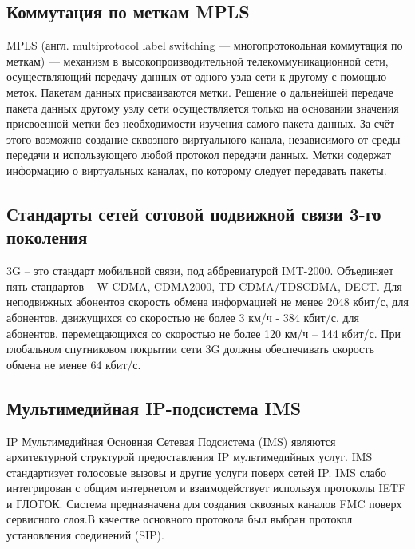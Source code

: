 \documentclass[unicode, 12pt, a4paper,oneside]{article}
\begin{document}
\begin{multicols}{2}
\subsection{Коммутация по меткам MPLS}
MPLS (англ. multiprotocol label switching — многопротокольная коммутация по меткам) — механизм в высокопроизводительной телекоммуникационной сети, осуществляющий передачу данных от одного узла сети к другому с помощью меток. Пакетам данных присваиваются метки. Решение о дальнейшей передаче пакета данных другому узлу сети осуществляется только на основании значения присвоенной метки без необходимости изучения самого пакета данных. За счёт этого возможно создание сквозного виртуального канала, независимого от среды передачи и использующего любой протокол передачи данных. Метки содержат информацию о виртуальных каналах, по которому следует передавать пакеты.

\subsection{Стандарты сетей сотовой подвижной связи 3-го поколения}
3G – это стандарт мобильной связи, под аббревиатурой IMT-2000. Объединяет пять стандартов – W-CDMA, CDMA2000, TD-CDMA/TDSCDMA, DECT.
Для неподвижных абонентов скорость обмена информацией не менее 2048 кбит/с, для абонентов, движущихся со скоростью не более 3 км/ч - 384 кбит/с, для абонентов, перемещающихся со скоростью не более 120 км/ч – 144 кбит/с. При глобальном спутниковом покрытии сети 3G должны обеспечивать скорость обмена не менее 64 кбит/с.

\subsection{Мультимедийная IP-подсистема IMS}
IP Мультимедийная Основная Сетевая Подсистема (IMS) являются архитектурной структурой предоставления IP мультимедийных услуг. IMS стандартизует голосовые вызовы и другие услуги поверх сетей IP. IMS слабо интегрирован с общим интернетом и взаимодействует используя протоколы IETF и ГЛОТОК. Система предназначена для создания сквозных каналов FMC поверх сервисного слоя.В качестве основного протокола был выбран протокол установления соединений (SIP).



\end{multicols}	
\end{document}
